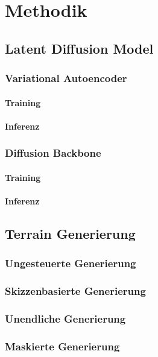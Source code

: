 \chapter{Methodik}

\section {Latent Diffusion Model}

\subsection {Variational Autoencoder}
\subsubsection {Training}
\subsubsection {Inferenz}

\subsection {Diffusion Backbone}
\subsubsection {Training}
\subsubsection {Inferenz}


\section {Terrain Generierung}
\subsection {Ungesteuerte Generierung}
\subsection {Skizzenbasierte Generierung}
\subsection {Unendliche Generierung}
\subsection {Maskierte Generierung}